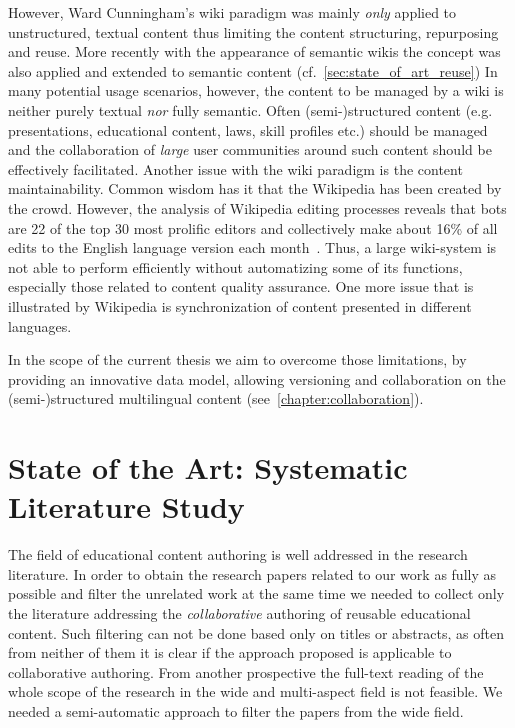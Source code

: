 \documentclass[PhD, Submit, ngerman,UKenglish,table]{scrbook}
\begin{document}
However, Ward Cunningham's wiki paradigm was mainly \emph{only} applied to unstructured, textual content thus limiting the content structuring, repurposing and reuse.
More recently with the appearance of semantic wikis the concept was also applied and extended to semantic content (cf.~\autoref{sec:state_of_art_reuse})
In many potential usage scenarios, however, the content to be managed by a wiki is neither purely textual \emph{nor} fully semantic.
Often (semi-)structured content (e.g. presentations, educational content, laws, skill profiles etc.) should be managed and the collaboration of \emph{large} user communities around such content should be effectively facilitated.
Another issue with the wiki paradigm is the content maintainability.
Common wisdom has it that the Wikipedia has been created by the crowd.
However, the analysis of Wikipedia editing processes reveals that bots are 22 of the top 30 most prolific editors and collectively make about 16\% of all edits to the English language version each month~\cite{geiger2011lives}.
Thus, a large wiki-system is not able to perform efficiently without automatizing some of its functions, especially those related to content quality assurance.
One more issue that is illustrated by Wikipedia is synchronization of content presented in different languages.

In the scope of the current thesis we aim to overcome those limitations, by providing an innovative data model, allowing versioning and collaboration on the (semi-)structured multilingual content (see~\autoref{chapter:collaboration}).



\chapter{State of the Art: Systematic Literature Study}
\label{chapter:related_work}
The field of educational content authoring is well addressed in the research literature.
In order to obtain the research papers related to our work as fully as possible and filter the unrelated work at the same time we needed to collect only the literature addressing the \emph{collaborative} authoring of reusable educational content.
Such filtering can not be done based only on titles or abstracts, as often from neither of them it is clear if the approach proposed is applicable to collaborative authoring.
From another prospective the full-text reading of the whole scope of the research in the wide and multi-aspect field is not feasible.
We needed a semi-automatic approach to filter the papers from the wide field.
\end{document}
